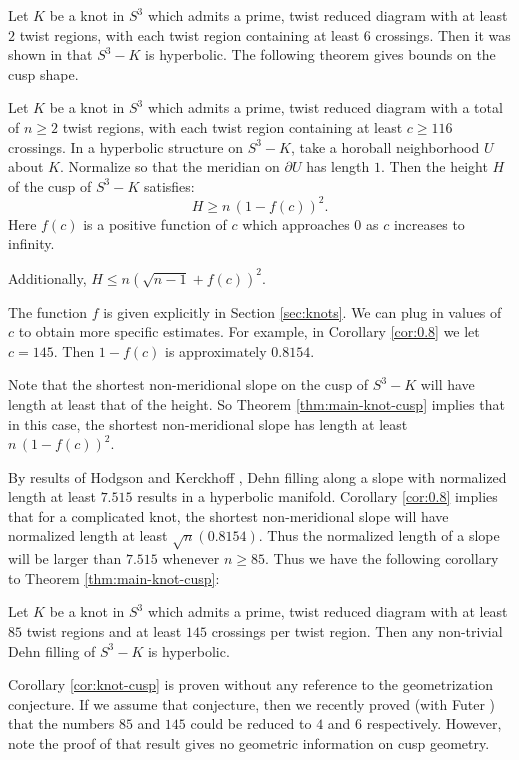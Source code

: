 Let $K$ be a knot in $S^3$ which admits a prime, twist reduced diagram
with at least $2$ twist regions, with each twist region containing at
least $6$ crossings.  Then it was shown in \cite{futer-purcell} that
$S^3-K$ is hyperbolic.  The following theorem gives bounds on the
cusp shape.

\begin{theorem}
  Let $K$ be a knot in $S^3$ which admits a prime, twist reduced
  diagram with a total of $n\geq 2$ twist regions, with each twist
  region containing at least $c\geq 116$ crossings.  In a hyperbolic
  structure on $S^3-K$, take a horoball neighborhood $U$ about $K$.
  Normalize so that the meridian on $\partial U$ has length $1$.  Then
  the height $H$ of the cusp of $S^3-K$ satisfies:
  $$H\geq n\,(1-f(c))^2.$$
  Here $f(c)$ is a positive function of $c$ which approaches $0$ as
  $c$ increases to infinity.

  Additionally, $H\leq n(\sqrt{n-1} + f(c))^2$.
\label{thm:main-knot-cusp}
\end{theorem}

The function $f$ is given explicitly in Section \ref{sec:knots}.  We
can plug in values of $c$ to obtain more specific estimates.  For
example, in Corollary \ref{cor:0.8} we let $c=145$.  Then $1-f(c)$ is
approximately $0.8154$.

Note that the shortest non-meridional slope on the cusp of $S^3-K$
will have length at least that of the height.  So Theorem
\ref{thm:main-knot-cusp} implies that in this case, the shortest
non-meridional slope has length at least $n\,(1-f(c))^2$.

By results of Hodgson and Kerckhoff \cite{hk:univ}, Dehn filling along
a slope with normalized length at least $7.515$ results in a hyperbolic
manifold.  Corollary \ref{cor:0.8} implies that for a complicated
knot, the shortest non-meridional slope will have normalized length at
least $\sqrt{n}(0.8154)$.  Thus the normalized length of a slope will
be larger than $7.515$ whenever $n\geq 85$.  Thus we have the
following corollary to Theorem \ref{thm:main-knot-cusp}:

\begin{corollary}
  Let $K$ be a knot in $S^3$ which admits a prime, twist reduced
  diagram with at least $85$ twist regions and at least $145$
  crossings per twist region.  Then any non-trivial {D}ehn filling of
  $S^3-K$ is hyperbolic.
\label{cor:knot-cusp}
\end{corollary}

Corollary \ref{cor:knot-cusp} is proven without any reference to the
geometrization conjecture.  If we assume that conjecture, then we
recently proved (with Futer \cite{futer-purcell}) that the numbers
$85$ and $145$ could be reduced to $4$ and $6$ respectively.  However,
note the proof of that result gives no geometric information on cusp
geometry.


